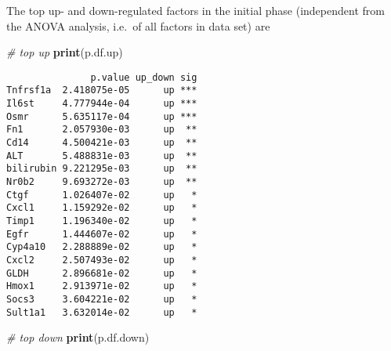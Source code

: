 \documentclass[]{article}
\newenvironment{Shaded}{\begin{snugshade}}{\end{snugshade}}
\newcommand{\KeywordTok}[1]{\textcolor[rgb]{0.13,0.29,0.53}{\textbf{{#1}}}}
\newcommand{\FloatTok}[1]{\textcolor[rgb]{0.00,0.00,0.81}{{#1}}}
\newcommand{\StringTok}[1]{\textcolor[rgb]{0.31,0.60,0.02}{{#1}}}
\newcommand{\CommentTok}[1]{\textcolor[rgb]{0.56,0.35,0.01}{\textit{{#1}}}}
\newcommand{\NormalTok}[1]{{#1}}
\begin{document}
\begin{Shaded}
\end{Shaded}

The top up- and down-regulated factors in the initial phase (independent
from the ANOVA analysis, i.e.~of all factors in data set) are \small

\begin{Shaded}
\begin{Highlighting}[]
\CommentTok{# top up}
\KeywordTok{print}\NormalTok{(p.df.up)}
\end{Highlighting}
\end{Shaded}

\begin{verbatim}
               p.value up_down sig
Tnfrsf1a  2.418075e-05      up ***
Il6st     4.777944e-04      up ***
Osmr      5.635117e-04      up ***
Fn1       2.057930e-03      up  **
Cd14      4.500421e-03      up  **
ALT       5.488831e-03      up  **
bilirubin 9.221295e-03      up  **
Nr0b2     9.693272e-03      up  **
Ctgf      1.026407e-02      up   *
Cxcl1     1.159292e-02      up   *
Timp1     1.196340e-02      up   *
Egfr      1.444607e-02      up   *
Cyp4a10   2.288889e-02      up   *
Cxcl2     2.507493e-02      up   *
GLDH      2.896681e-02      up   *
Hmox1     2.913971e-02      up   *
Socs3     3.604221e-02      up   *
Sult1a1   3.632014e-02      up   *
\end{verbatim}

\begin{Shaded}
\begin{Highlighting}[]
\CommentTok{# top down}
\KeywordTok{print}\NormalTok{(p.df.down)}
\end{Highlighting}
\end{Shaded}
\end{document}
